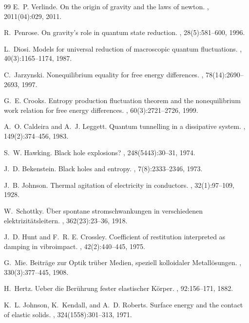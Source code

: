\documentclass[12pt,twoside]{article}
\begin{document}

\begin{thebibliography}{99}
E.~P. Verlinde.
\newblock On the origin of gravity and the laws of newton.
, 2011(04):029, 2011.

R.~Penrose.
\newblock On gravity's role in quantum state reduction.
, 28(5):581--600, 1996.

L.~Diosi.
\newblock Models for universal reduction of macroscopic quantum fluctuations.
, 40(3):1165--1174, 1987.

C.~Jarzynski.
\newblock Nonequilibrium equality for free energy differences.
, 78(14):2690--2693, 1997.

G.~E. Crooks.
\newblock Entropy production fluctuation theorem and the nonequilibrium work relation for free energy differences.
, 60(3):2721--2726, 1999.

A.~O. Caldeira and A.~J. Leggett.
\newblock Quantum tunnelling in a dissipative system.
, 149(2):374--456, 1983.

S.~W. Hawking.
\newblock Black hole explosions?
, 248(5443):30--31, 1974.

J.~D. Bekenstein.
\newblock Black holes and entropy.
, 7(8):2333--2346, 1973.

J.~B. Johnson.
\newblock Thermal agitation of electricity in conductors.
, 32(1):97--109, 1928.

W.~Schottky.
\newblock Über spontane stromschwankungen in verschiedenen elektrizitätsleitern.
, 362(23):23--36, 1918.

J.~D. Hunt and F.~R. E. Crossley.
\newblock Coefficient of restitution interpreted as damping in vibroimpact.
, 42(2):440--445, 1975.

G.~Mie.
\newblock Beiträge zur Optik trüber Medien, speziell kolloidaler Metallösungen.
, 330(3):377--445, 1908.

H.~Hertz.
\newblock Ueber die Berührung fester elastischer Körper.
, 92:156--171, 1882.

K.~L. Johnson, K.~Kendall, and A.~D. Roberts.
\newblock Surface energy and the contact of elastic solids.
, 324(1558):301--313, 1971.

\end{thebibliography}
\end{document}
